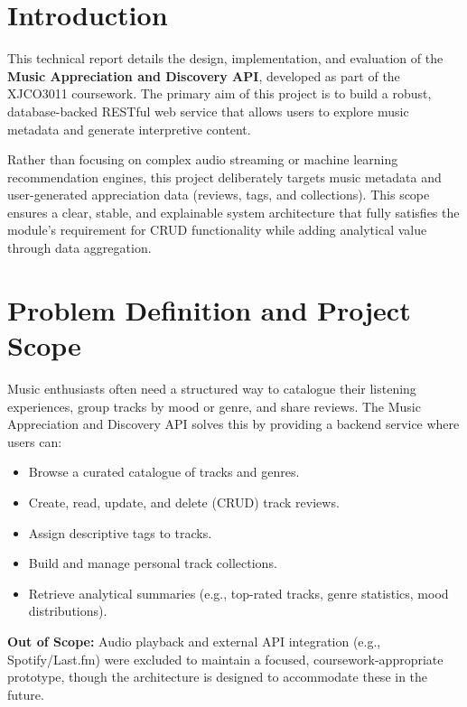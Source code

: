 \documentclass[11pt,a4paper]{article}
\begin{document}
\newpage

\section{Introduction}

This technical report details the design, implementation, and evaluation of the \textbf{Music Appreciation and Discovery API}, developed as part of the XJCO3011 coursework. The primary aim of this project is to build a robust, database-backed RESTful web service that allows users to explore music metadata and generate interpretive content. 

Rather than focusing on complex audio streaming or machine learning recommendation engines, this project deliberately targets music metadata and user-generated appreciation data (reviews, tags, and collections). This scope ensures a clear, stable, and explainable system architecture that fully satisfies the module's requirement for CRUD functionality while adding analytical value through data aggregation.

\section{Problem Definition and Project Scope}

Music enthusiasts often need a structured way to catalogue their listening experiences, group tracks by mood or genre, and share reviews. The Music Appreciation and Discovery API solves this by providing a backend service where users can:
\begin{itemize}[label=\textcolor{primary}{\textbullet}, noitemsep]
    \item Browse a curated catalogue of tracks and genres.
    \item Create, read, update, and delete (CRUD) track reviews.
    \item Assign descriptive tags to tracks.
    \item Build and manage personal track collections.
    \item Retrieve analytical summaries (e.g., top-rated tracks, genre statistics, mood distributions).
\end{itemize}

\textbf{Out of Scope:} Audio playback and external API integration (e.g., Spotify/Last.fm) were excluded to maintain a focused, coursework-appropriate prototype, though the architecture is designed to accommodate these in the future.
\end{document}
